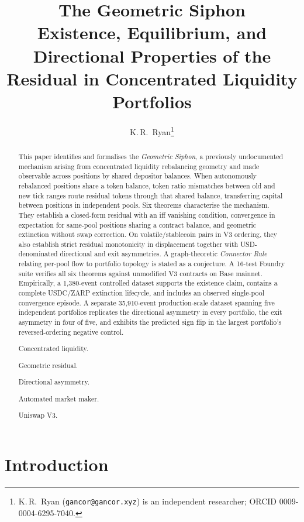 \documentclass{manuscript}
\title{The Geometric Siphon\\
Existence, Equilibrium, and Directional Properties of the Residual in Concentrated Liquidity Portfolios}
\author{K.\,R.~Ryan\thanks{K.\,R.~Ryan (\texttt{gancor@gancor.xyz}) is an independent researcher; ORCID 0009-0004-6295-7040.}}
\begin{document}
\maketitle
\thispagestyle{pagefirst}

\begin{abstract}
This paper identifies and formalises the \emph{Geometric Siphon}, a previously undocumented mechanism arising from concentrated liquidity rebalancing geometry and made observable across positions by shared depositor balances. When autonomously rebalanced positions share a token balance, token ratio mismatches between old and new tick ranges route residual tokens through that shared balance, transferring capital between positions in independent pools. Six theorems characterise the mechanism. They establish a closed-form residual with an iff vanishing condition, convergence in expectation for same-pool positions sharing a contract balance, and geometric extinction without swap correction. On volatile/stablecoin pairs in V3 ordering, they also establish strict residual monotonicity in displacement together with USD-denominated directional and exit asymmetries. A graph-theoretic \emph{Connector Rule} relating per-pool flow to portfolio topology is stated as a conjecture. A 16-test Foundry suite verifies all six theorems against unmodified V3 contracts on Base mainnet. Empirically, a 1{,}380-event controlled dataset supports the existence claim, contains a complete USDC/ZARP extinction lifecycle, and includes an observed single-pool convergence episode. A separate 35{,}910-event production-scale dataset spanning five independent portfolios replicates the directional asymmetry in every portfolio, the exit asymmetry in four of five, and exhibits the predicted sign flip in the largest portfolio's reversed-ordering negative control.

\begin{keywords}
\item Concentrated liquidity.
\item Geometric residual.
\item Directional asymmetry.
\item Automated market maker.
\item Uniswap V3.
\end{keywords}
\end{abstract}

\let\item\olditem

\section{Introduction}\label{sec:introduction}
\end{document}
